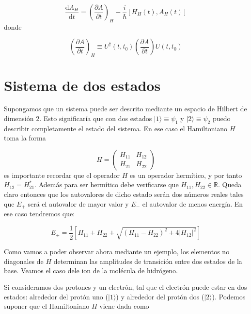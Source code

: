 \documentclass[12pt,a4paper]{book}
\numberwithin{equation}{chapter}
\numberwithin{figure}{chapter}
\newcommand{\parentesis}[1]{\left( #1  \right)}
\newcommand{\parciales}[2]{\frac{\partial #1}{\partial #2}}
\newcommand{\ccorchetes}[1]{\left[ #1  \right]}
\newcommand{\D}{\mathrm{d}}
\newcommand{\derivadas}[2]{\frac{\D #1}{\D #2}}
\begin{document}
\begin{equation}
\derivadas{A_H}{t} = \parentesis{\parciales{A}{t}}_H + \frac{i}{\hbar} \ccorchetes{ H_H (t), A_H (t) }
\end{equation}
donde 

\begin{equation}
 \parentesis{\parciales{A}{t}}_H  \equiv U^\dagger (t,t_0) 
 \parentesis{\parciales{A}{t}} U (t,t_0)
\end{equation}


\section{Sistema de dos estados}

Supongamos que un sistema puede ser descrito mediante un espacio de Hilbert de dimensión 2. Esto significaría que con dos estados $|1\rangle \equiv \psi_1$ y $|2\rangle \equiv \psi_2$ puedo describir completamente el estado del sistema. En ese caso el Hamiltoniano $H$ toma la forma

\begin{equation}
H = \begin{pmatrix}
H_{11} & H_{12} \\
H_{21} & H_{22}
\end{pmatrix}
\end{equation} 
es importante recordar que el operador $H$ es un operador hermítico, y por tanto $H_{12} = H^*_{21}$. Además para ser hermítico debe verificarse que $H_{11},H_{22} \in \mathbb{R}$. Queda claro entonces que los autovalores de dicho estado serán dos números reales tales que $E_+$ será el autovalor de mayor valor y $E_-$ el autovalor de menos energía. En ese caso tendremos que:

\begin{equation}
E_\pm = \frac{1}{2} \ccorchetes{H_{11}+H_{22}\pm\sqrt{(H_{11}-H_{22} )^2 + 4 |H_{12}|^2}} \label{Ec:2.07-Dos_estados}
\end{equation}

Como vamos a poder observar ahora mediante un ejemplo, los elementos no diagonales de $H$ determinan las amplitudes de transición entre dos estados de la base. Veamos el caso dele ion de la molécula de hidrógeno. \\  


\hrulefill

Si consideramos dos protones y un electrón, tal que el electrón puede estar en dos estados: alrededor del protón uno ($|1\rangle$) y alrededor del protón dos ($|2\rangle$). Podemos suponer que el Hamiltoniano $H$ viene dada como
\end{document}
